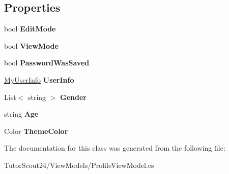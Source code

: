 \subsection*{Properties}
\begin{DoxyCompactItemize}
\item 
\mbox{\label{class_tutor_scout24_1_1_view_models_1_1_profile_view_model_a4e47b57953c9c24f3f93bd11ea59720a}} 
bool {\bfseries Edit\+Mode}
\item 
\mbox{\label{class_tutor_scout24_1_1_view_models_1_1_profile_view_model_ae23401deb93051cbf0b5b0bcd703ca40}} 
bool {\bfseries View\+Mode}
\item 
\mbox{\label{class_tutor_scout24_1_1_view_models_1_1_profile_view_model_ac0fdbf3ceec4e2f21b20ae46846dda4f}} 
bool {\bfseries Password\+Was\+Saved}
\item 
\mbox{\label{class_tutor_scout24_1_1_view_models_1_1_profile_view_model_a3fb58ee71469f6db7af65dce23325681}} 
\mbox{\hyperlink{class_tutor_scout24_1_1_models_1_1_user_data_1_1_my_user_info}{My\+User\+Info}} {\bfseries User\+Info}
\item 
\mbox{\label{class_tutor_scout24_1_1_view_models_1_1_profile_view_model_a1ea898d8c20664ab8d70a0dcdf7a42aa}} 
List$<$ string $>$ {\bfseries Gender}
\item 
\mbox{\label{class_tutor_scout24_1_1_view_models_1_1_profile_view_model_a675a8ac161cc3d60931dce5abc0aea91}} 
string {\bfseries Age}
\item 
\mbox{\label{class_tutor_scout24_1_1_view_models_1_1_profile_view_model_a2cf124bb2e06fb0d08ea71bace8daf70}} 
Color {\bfseries Theme\+Color}
\end{DoxyCompactItemize}


The documentation for this class was generated from the following file\+:\begin{DoxyCompactItemize}
\item 
Tutor\+Scout24/\+View\+Models/Profile\+View\+Model.\+cs\end{DoxyCompactItemize}

